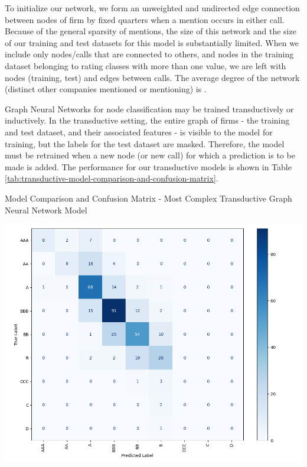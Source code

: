 \documentclass{article}[11pt]
\begin{document}

    To initialize our network, we form an unweighted and undirected edge connection between nodes of firm by fixed quarters when a mention occurs in either call. Because of the general sparsity of mentions, the size of this network and the size of our training and test datasets for this model is substantially limited. When we include only nodes/calls that are connected to others, and nodes in the training dataset belonging to rating classes with more than one value, we are left with \numNodes \space nodes (\numTrainNodes \space training, \numTestNodes \space test) and \numEdges \space edges between calls. The average degree of the network (distinct other companies mentioned or mentioning) is \averageDegree.

    Graph Neural Networks for node classification may be trained transductively or inductively. In the transductive setting, the entire graph of firms - the training and test dataset, and their associated features - is visible to the model for training, but the labels for the test dataset are masked. Therefore, the model must be retrained when a new node (or new call) for which a prediction is to be made is added. The performance for our transductive models is shown in Table \ref{tab:transductive-model-comparison-and-confusion-matrix}.

    \begin{table}[h!]
        \centering
        \caption{Model Comparison and Confusion Matrix - Most Complex Transductive Graph Neural Network Model}
        \begin{minipage}[c]{0.495\linewidth}
            \centering
            
        \end{minipage}
        \begin{minipage}[c]{0.495\linewidth}
            \centering
            \includegraphics[width=0.95\hsize]{../Output/Modelling/Graph Neural Network/Transductive/confusion_matrix_no_title.png}
        \end{minipage}
        \label{tab:transductive-model-comparison-and-confusion-matrix}
    \end{table}
\end{document}
